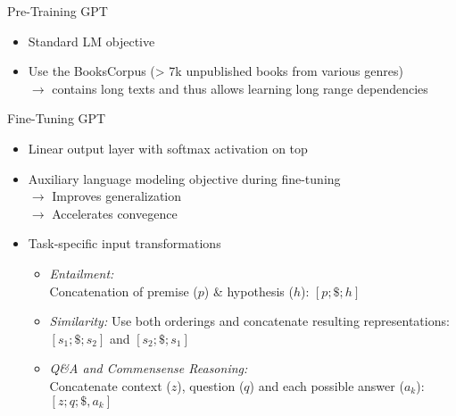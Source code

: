 
\begin{vbframe}{Pre-Training GPT}

\vfill

\begin{itemize}
		\item Standard LM objective
		\item Use the BooksCorpus (> 7k unpublished books from various genres) \\
					$\to$ contains long texts and thus allows learning long range dependencies
\end{itemize}

\vfill

\end{vbframe}


\begin{vbframe}{Fine-Tuning GPT}

\vfill
			
\begin{itemize}
		\item Linear output layer with softmax activation on top
		\item Auxiliary language modeling objective during fine-tuning\\
					$\rightarrow$ Improves generalization\\
					$\rightarrow$ Accelerates convegence
		\item Task-specific input transformations
					\begin{itemize}
						\item \textit{Entailment:} \\ Concatenation of premise ($p$) \& hypothesis ($h$): $[p; \$; h]$
						\item \textit{Similarity:} Use both orderings and concatenate resulting representations: $[s_1; \$; s_2]$ and $[s_2; \$; s_1]$
						\item \textit{Q\&A and Commensense Reasoning:} \\ Concatenate context ($z$), question ($q$) and each possible answer ($a_k$): $[z; q; \$, a_k]$
					\end{itemize}
\end{itemize}

\vfill

\end{vbframe}

